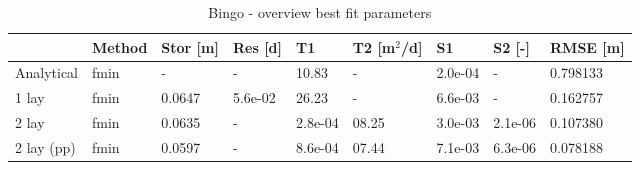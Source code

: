 \begin{table}[h!]
\small
\centering
\caption{Bingo - overview best fit parameters}
\label{tab:bing_table}
\begin{tabular}{l|l|l|l|ll|ll|l}
\hline 
\textbf{}       & \textbf{Method} & \textbf{Stor [m]} & \textbf{Res [d]} & \textbf{T1}  & \textbf{T2   [m$^2$/d]}  & \textbf{S1}  & \textbf{S2 [-]}  & \textbf{RMSE [m]} \\ \hline \hline
Analytical                & fmin             & -             & -            & 10.83      & -          & 2.0e-04    & -          & 0.798133 \\
1 lay                     & fmin             & 0.0647        & 5.6e-02      & 26.23      & -          & 6.6e-03    & -          & 0.162757 \\
2 lay                     & fmin             & 0.0635        & -            & 2.8e-04    & 08.25      & 3.0e-03    & 2.1e-06    & 0.107380 \\
2 lay (pp)                & fmin             & 0.0597        & -            & 8.6e-04    & 07.44      & 7.1e-03    & 6.3e-06    & 0.078188 \\ \hline    
\end{tabular}
\end{table}



